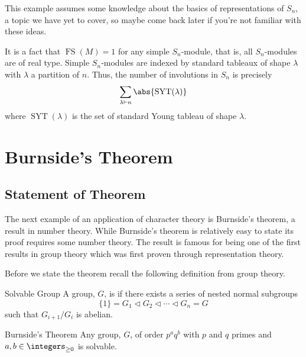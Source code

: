 \documentclass[fleqn]{NotesClass}
\newcommand{\partition}{\vdash}
\DeclareMathOperator{\frobeniusSchur}{FS}
\DeclareMathOperator{\standardYoungTableaux}{SYT}
\newcommand{\normalsub}{\mathrel{\lhd}}
\begin{document}
    \begin{exm}{}{}
        This example assumes some knowledge about the basics of representations of \(S_n\), a topic we have yet to cover, so maybe come back later if you're not familiar with these ideas.
        
        It is a fact that \(\frobeniusSchur(M) = 1\) for any simple \(S_n\)-module, that is, all \(S_n\)-modules are of real type.
        Simple \(S_n\)-modules are indexed by standard tableaux of shape \(\lambda\) with \(\lambda\) a partition of \(n\).
        Thus, the number of involutions in \(S_n\) is precisely
        \begin{equation}
            \sum_{\lambda \partition n} \abs{\standardYoungTableaux(\lambda)}
        \end{equation}
        where \(\standardYoungTableaux(\lambda)\) is the set of standard Young tableau of shape \(\lambda\).
    \end{exm}
    
    \section{Burnside's Theorem}
    \subsection{Statement of Theorem}
    The next example of an application of character theory is Burnside's theorem, a result in number theory.
    While Burnside's theorem is relatively easy to state its proof requires some number theory.
    The result is famous for being one of the first results in group theory which was first proven through representation theory.
    
    Before we state the theorem recall the following definition from group theory.
    \begin{dfn}{Solvable Group}{}
        A group, \(G\), is  if there exists a series of nested normal subgroups
        \begin{equation}
            \{1\} = G_1 \normalsub G_2 \normalsub \dotsb \normalsub G_n = G
        \end{equation}
        such that \(G_{i+1}/G_i\) is abelian.
    \end{dfn}
    
    \begin{thm*}{Burnside's Theorem}{}
        Any group, \(G\), of order \(p^aq^b\) with \(p\) and \(q\) primes and \(a, b \in \integers_{\ge 0}\) is solvable.
    \end{thm*}
    
\end{document}
